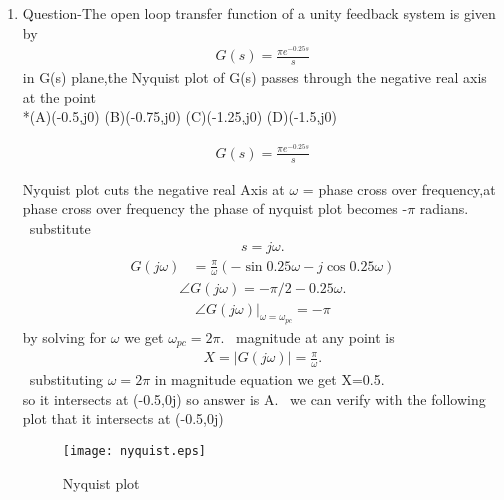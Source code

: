 \begin{enumerate}[label=\thesection.\arabic*.,ref=\thesection.\theenumi]
\item Question-The open loop transfer function of a unity feedback system is given by
\begin{align*}
 G(s)=\frac{\pi e^{-0.25s}}{s}
\end{align*}
in G(s) plane,the Nyquist plot of G(s) passes through the negative real axis at the point
\\*(A)(-0.5,j0)  (B)(-0.75,j0)  (C)(-1.25,j0)  (D)(-1.5,j0)


 

\solution
\begin{align}
G(s)=\frac{\pi e^{-0.25s}}{s}
\end{align}

 Nyquist plot cuts the negative real
Axis at $\omega$ = phase cross over frequency,at phase cross over frequency the phase of nyquist plot becomes -$\pi$ radians.
\
\newline substitute \begin{align}
s=j\omega.\end{align} 
\begin{align}
G(j\omega)&=\frac{\pi}{\omega}(-\sin{0.25\omega}-j\cos{0.25\omega})
\end{align}
\begin{align}
\angle G(j\omega)=-\pi/2 -0.25\omega.
\end{align}
\begin{align}
\angle G(j\omega)|_{\omega=\omega_{pc}}=-\pi
\end{align}
by solving for $\omega$ we get $\omega_{pc}=2\pi$.
\
\newline magnitude at any point is\begin{align}
X=|G(j\omega)|=\frac{\pi}{\omega}.    
\end{align} 
\
\newline substituting $\omega=2\pi$ in magnitude equation we get X=0.5.
\\
\newline so it intersects at (-0.5,0j) so answer is A.
\
\newline we can verify with the following plot that it intersects at (-0.5,0j)
\begin{figure}
  \texttt{[image: nyquist.eps]}
  \caption{Nyquist plot}
  \label{fig:Nyquist plot}
\end{figure}


\end{enumerate}
